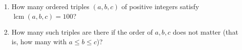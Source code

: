 \begin{enumerate}
\item[(a)] How many ordered triples $(a,b,c)$ of positive integers satisfy $\operatorname{lcm}(a,b,c)=100$?
\item[(b)] How many such triples are there if the order of $a,b,c$ does not matter (that is, how many with $a\le b\le c$)?
\end{enumerate}
